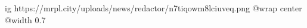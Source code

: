  
 
 
 
 

\ifcmt
  ig https://mrpl.city/uploads/news/redactor/n7tiqowm8lciuveq.png
  @wrap center
  @width 0.7
\fi
